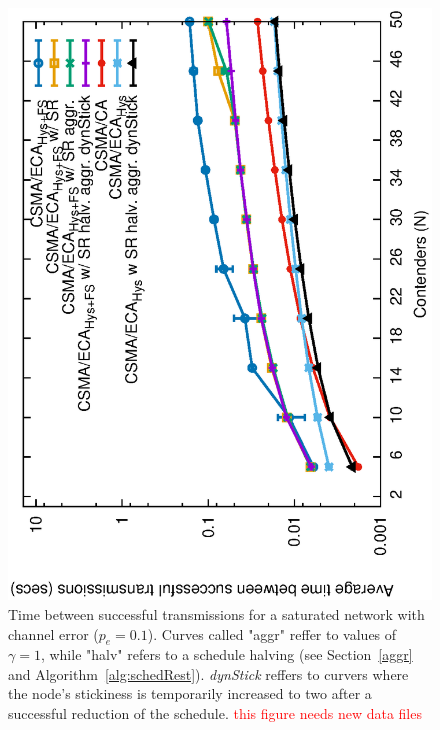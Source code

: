 	\begin{figure}[tb]
		\centering
		\includegraphics[width=0.7\linewidth,angle=-90]{figures/tonFigs/timeBetSxTx-sat-SR-TON.eps}
		\caption{Time between successful transmissions for a saturated network with channel error ($p_e=0.1$). Curves called "aggr" reffer to values of $\gamma=1$, while "halv" refers to a schedule halving (see Section~\ref{aggr} and Algorithm~\ref{alg:schedRest}). \emph{dynStick} reffers to curvers where the node's stickiness is temporarily increased to two after a successful reduction of the schedule. \textcolor{red}{this figure needs new data files}}
		\label{fig:timeBetSxTx-sat-SR}
	\end{figure}
